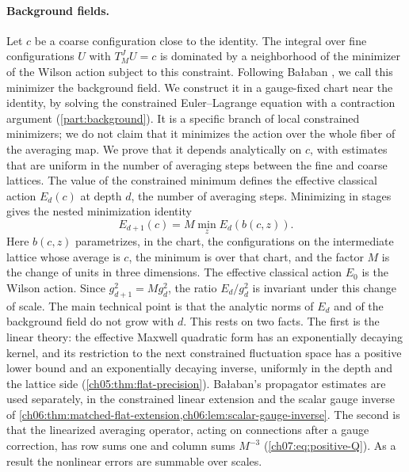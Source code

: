 \paragraph{Background fields.}
Let $c$ be a coarse configuration close to the identity. The integral over fine configurations $U$ with $T_M^JU=c$ is dominated by a neighborhood of the minimizer of the Wilson action subject to this constraint. Following Bałaban \cite{Balaban1985Variational}, we call this minimizer the background field. We construct it in a gauge-fixed chart near the identity, by solving the constrained Euler--Lagrange equation with a contraction argument (\cref{part:background}). It is a specific branch of local constrained minimizers; we do not claim that it minimizes the action over the whole fiber of the averaging map. We prove that it depends analytically on $c$, with estimates that are uniform in the number of averaging steps between the fine and coarse lattices. The value of the constrained minimum defines the effective classical action $E_d(c)$ at depth $d$, the number of averaging steps. Minimizing in stages gives the nested minimization identity
\[
 E_{d+1}(c)=M\min_zE_d(b(c,z)).
\]
Here $b(c,z)$ parametrizes, in the chart, the configurations on the intermediate lattice whose average is $c$, the minimum is over that chart, and the factor $M$ is the change of units in three dimensions. The effective classical action $E_0$ is the Wilson action. Since $g^2_{d+1}=Mg^2_d$, the ratio $E_d/g_d^2$ is invariant under this change of scale. The main technical point is that the analytic norms of $E_d$ and of the background field do not grow with $d$. This rests on two facts. The first is the linear theory: the effective Maxwell quadratic form has an exponentially decaying kernel, and its restriction to the next constrained fluctuation space has a positive lower bound and an exponentially decaying inverse, uniformly in the depth and the lattice side (\cref{ch05:thm:flat-precision}). Bałaban's propagator estimates \cite{Balaban1984I,Balaban1984II,Balaban1985Background} are used separately, in the constrained linear extension and the scalar gauge inverse of \cref{ch06:thm:matched-flat-extension,ch06:lem:scalar-gauge-inverse}. The second is that the linearized averaging operator, acting on connections after a gauge correction, has row sums one and column sums $M^{-3}$ (\cref{ch07:eq:positive-Q}). As a result the nonlinear errors are summable over scales.

